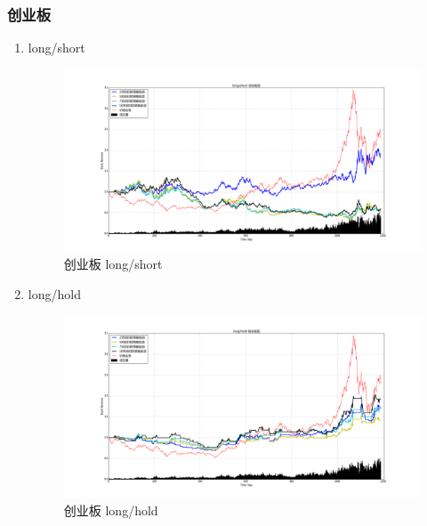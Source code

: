 \documentclass[12pt,a4paper]{article}
\begin{document}
\subsubsection{创业板}
\begin{enumerate}
\item long/short 
\begin{figure}[H]
	\centering
	\includegraphics[width=1.0\textwidth]{img_r_7/cyb.png}
	\caption{创业板 long/short}
\end{figure}
\item long/hold 
\begin{figure}[H]
	\centering
	\includegraphics[width=1.0\textwidth]{img_r_7/cyb_1.png}
	\caption{创业板 long/hold }
\end{figure}
\end{enumerate}
\end{document}
